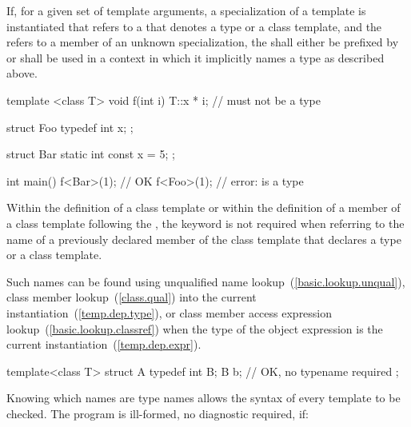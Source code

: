\pnum
If, for a given set of template arguments, a specialization of a template is
instantiated
that refers to a 
that denotes a type
or a class template,
and the
 refers to a member of an unknown specialization,
the  shall either be
prefixed by  or shall be used in a context in which it
implicitly names a type as described above. \begin{example}

\begin{codeblock}
template <class T> void f(int i) {
  T::x * i;         //  must not be a type
}

struct Foo {
  typedef int x;
};

struct Bar {
  static int const x = 5;
};

int main() {
  f<Bar>(1);        // OK
  f<Foo>(1);        // error:  is a type
}
\end{codeblock}
\end{example}

\pnum
Within the definition of a class template or within the definition of a
member of a class template following the , the keyword
is not required when referring to the name of a previously
declared member of the class template that declares a type
or a class template.
\begin{note} Such names can be found using unqualified name lookup~(\ref{basic.lookup.unqual}),
class member lookup~(\ref{class.qual}) into the current instantiation~(\ref{temp.dep.type}),
or class member access expression lookup~(\ref{basic.lookup.classref}) when the
type of the object expression is the current instantiation~(\ref{temp.dep.expr}).
\end{note}
\begin{example}

\begin{codeblock}
template<class T> struct A {
  typedef int B;
  B b;              // OK, no typename required
};
\end{codeblock}
\end{example}

\pnum
{}%
%
Knowing which names are type names allows the syntax of every template
to be checked.
The program is ill-formed, no diagnostic required, if:

